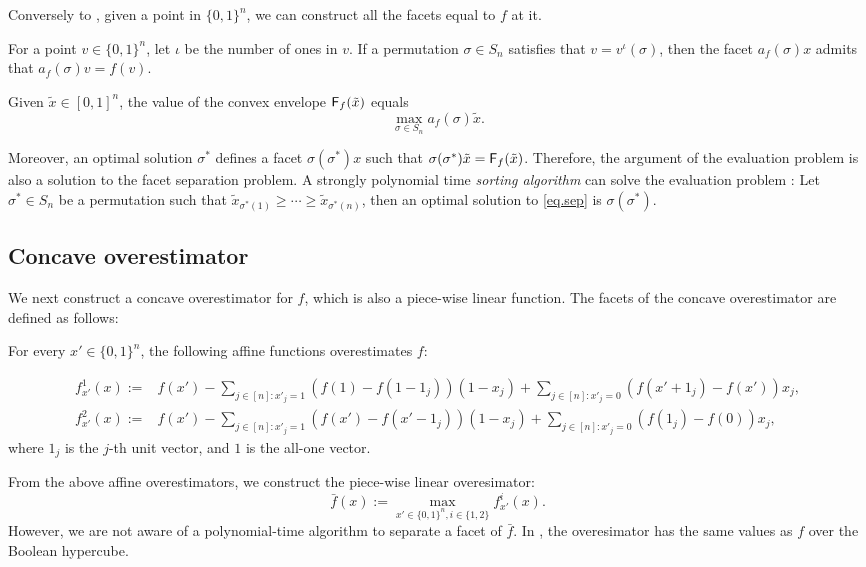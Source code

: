   Conversely to , given a point in $\{0,1\}^n$, we can construct all the facets equal to $f$ at it.
 
  \begin{corollary}
  \label{cor.point}
   For a point $v \in \{0,1\}^n$, let $\iota$ be the number of ones in $v$. If  a permutation $\sigma \in S_n$ satisfies that $v = v^\iota(\sigma)$, then the facet $a_f(\sigma) x$ admits that $a_f(\sigma) v=f(v)$.
  \end{corollary}



Given $\tilde{x} \in [0,1]^n$, the value of the convex envelope ${\mathsf F}_{f}(\tilde{x})$ equals 
\begin{equation}
\label{eq.sep}
    \max_{\sigma \in S_n} a_f(\sigma)  \tilde{x}.
\end{equation}

Moreover, an optimal solution $\sigma^\ast$ defines a facet $\sigma(\sigma^\ast)x$ such that $\sigma(\sigma^\ast) \tilde{x} = {\mathsf F}_{f}(\tilde{x})$. Therefore, the argument of the evaluation problem  is also  a solution to  the facet separation problem. A strongly polynomial time   \textit{sorting algorithm}  can  solve the evaluation problem \cite{Atamturk2021}: Let $\sigma^\ast \in S_n$ be a permutation  such that $\tilde{x}_{\sigma^\ast(1)}\ge\cdots  \ge \tilde{x}_{\sigma^\ast(n)} $,  then an optimal solution to \eqref{eq.sep} is  $\sigma(\sigma^\ast)$.
  
\subsection{Concave overestimator}
\label{sec.concaveover}

We next construct a concave overestimator for $f$, which is also a piece-wise linear function. The facets of the concave overestimator are defined as follows:

\begin{theorem}
 For every $x' \in \{0,1\}^n$,   the following  affine  functions overestimates $f$:

\begin{align*}
     	f^1_{x'}(x):=&f(x')  - \sum_{j \in [n]: x'_j = 1} \left (f(1) - f(1 - 1_j) \right) (1 - x_j) + \sum_{ j \in [n]: x'_j = 0} \left (f(x'+ 1_j) - f(x') \right) x_j,\\
     	f^2_{x'}(x):=&f(x')  - \sum_{j \in [n]: x'_j = 1} \left (f(x') - f(x'-1_j) \right) (1 - x_j) + \sum_{ j \in [n]: x'_j = 0} \left (f(1_j) - f(0) \right) x_j,    
\end{align*}
where $1_j$ is the $j$-th unit vector, and $1$ is the all-one vector.
\end{theorem}
 From the above affine overestimators, we construct the piece-wise linear overesimator:
 \begin{equation}
     \bar{f}(x):= \max_{x' \in \{0,1\}^n, i \in \{1,2\} } f^i_{x'}(x).
 \end{equation}
However, we are not aware of a  polynomial-time algorithm to separate a facet of $\bar{f}$. In \citep{nemhauser1978analysis}, the overesimator has the same values as $f$ over the Boolean hypercube.





